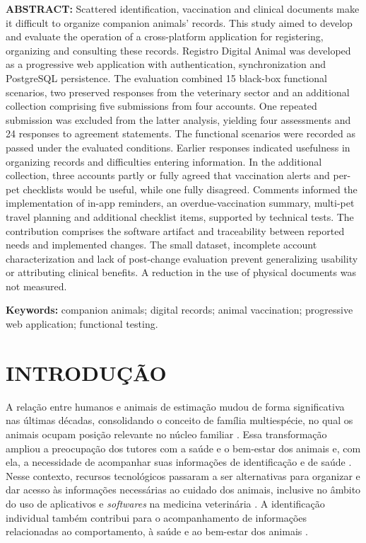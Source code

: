 \documentclass{UNESC}
\begin{document}
\vspace{1.0em}
\noindent
\textbf{ABSTRACT:} Scattered identification, vaccination and clinical documents make it difficult to organize companion animals' records. This study aimed to develop and evaluate the operation of a cross-platform application for registering, organizing and consulting these records. Registro Digital Animal was developed as a progressive web application with authentication, synchronization and PostgreSQL persistence. The evaluation combined 15 black-box functional scenarios, two preserved responses from the veterinary sector and an additional collection comprising five submissions from four accounts. One repeated submission was excluded from the latter analysis, yielding four assessments and 24 responses to agreement statements. The functional scenarios were recorded as passed under the evaluated conditions. Earlier responses indicated usefulness in organizing records and difficulties entering information. In the additional collection, three accounts partly or fully agreed that vaccination alerts and per-pet checklists would be useful, while one fully disagreed. Comments informed the implementation of in-app reminders, an overdue-vaccination summary, multi-pet travel planning and additional checklist items, supported by technical tests. The contribution comprises the software artifact and traceability between reported needs and implemented changes. The small dataset, incomplete account characterization and lack of post-change evaluation prevent generalizing usability or attributing clinical benefits. A reduction in the use of physical documents was not measured.

\vspace{0.5em}
\noindent
\textbf{Keywords:} companion animals; digital records; animal vaccination; progressive web application; functional testing.

\section{INTRODUÇÃO}

A relação entre humanos e animais de estimação mudou de forma significativa nas últimas décadas, consolidando o conceito de família multiespécie, no qual os animais ocupam posição relevante no núcleo familiar \cite{BOLSON2022}. Essa transformação ampliou a preocupação dos tutores com a saúde e o bem-estar dos animais e, com ela, a necessidade de acompanhar suas informações de identificação e de saúde \cite{MORAES2024}. Nesse contexto, recursos tecnológicos passaram a ser alternativas para organizar e dar acesso às informações necessárias ao cuidado dos animais, inclusive no âmbito do uso de aplicativos e \textit{softwares} na medicina veterinária \cite{MORAES2024}. A identificação individual também contribui para o acompanhamento de informações relacionadas ao comportamento, à saúde e ao bem-estar dos animais \cite{vidal2021}.
\end{document}
